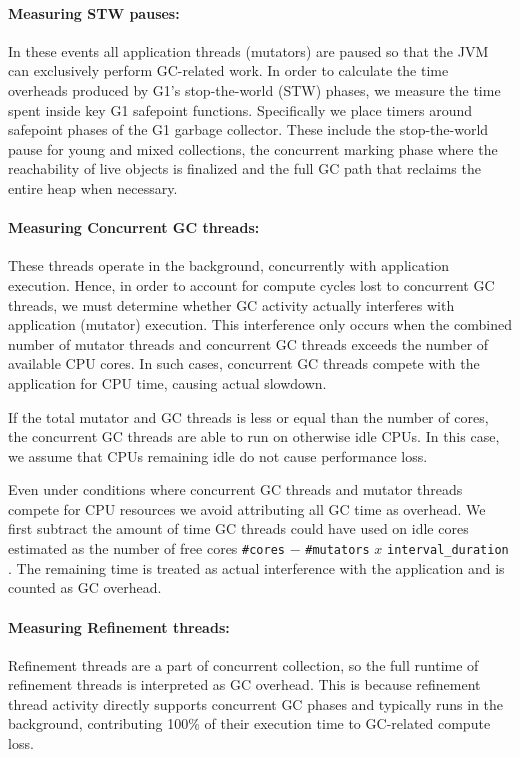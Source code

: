 \paragraph{Measuring STW pauses:} In these events
all application threads (mutators) are paused so that the JVM can exclusively perform
GC-related work. In order to calculate the time overheads produced by G1’s stop-the-world (STW) phases,
we measure the time spent inside key G1 safepoint functions.
Specifically we place timers around safepoint phases of the G1 garbage collector.
These include the stop-the-world pause for young and mixed collections, the concurrent
marking phase where the reachability of live objects is finalized and the full GC path
that reclaims the entire heap when necessary.

\paragraph{Measuring Concurrent GC threads:} These threads operate in the background,
concurrently with application execution.
Hence, in order to account for compute cycles lost to concurrent GC threads,
we must determine whether GC activity actually interferes with
application (mutator) execution. This interference only occurs when the combined number of
mutator threads and concurrent GC threads exceeds the number of available
CPU cores. In such cases, concurrent GC threads compete with the application
for CPU time, causing actual slowdown.

If the total mutator and GC threads is less or equal than the number of cores, the concurrent
GC threads are able to run on otherwise idle CPUs. In this case, we assume that
CPUs remaining idle do not cause performance loss.

Even under conditions where concurrent GC threads and mutator threads compete for CPU resources we avoid attributing all GC time as overhead.
We first subtract the amount of time GC threads could have used on idle cores estimated
as the number of free cores \texttt{\#cores} $-$ \texttt{\#mutators} $x$ \texttt{interval\_duration} .
The remaining time is treated as actual interference with the
application and is counted as GC overhead.

\paragraph{Measuring Refinement threads:} Refinement threads are a part of concurrent collection,
so the full runtime of refinement threads is interpreted as GC overhead. This is because refinement thread
activity directly supports concurrent GC phases and typically runs in the background,
contributing 100\% of their execution time to GC-related compute loss.


